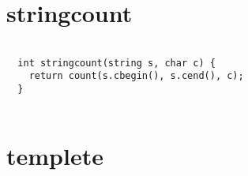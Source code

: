 \documentclass{jsarticle}
\begin{document}
\color{white}
\section{stringcount}
\color{black}
\begin{lstlisting}[caption=stringcount]

  int stringcount(string s, char c) {
    return count(s.cbegin(), s.cend(), c);
  }
  

\end{lstlisting}

\color{white}
\section{templete}
\color{black}
\begin{lstlisting}[caption=templete]


\end{lstlisting}
\end{document}
